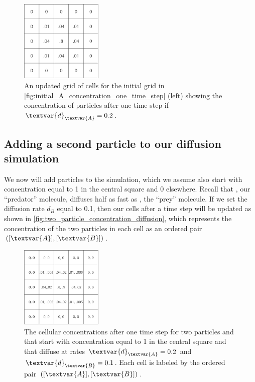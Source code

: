 \begin{figure}[h]
\centering
\mySfFamily
\includegraphics[width = 0.35\textwidth]{../images/A_concentration_slower_diffusion.png}
\caption{An updated grid of cells for the initial grid in \autoref{fig:initial_A_concentration_one_time_step} (left) showing the concentration of  particles after one time step if $\textvar{d}_\textvar{A} = \text{0.2}$.}
\label{fig:A_concentration_slower_diffusion}
\end{figure}

\subsection{Adding a second particle to our diffusion simulation}

We now will add  particles to the simulation, which we assume also start with concentration equal to 1 in the central square and 0 elsewhere. Recall that , our ``predator'' molecule, diffuses half as fast as , the ``prey'' molecule. If we set the diffusion rate $d_B$ equal to 0.1, then our cells after a time step will be updated as shown in \autoref{fig:two_particle_concentration_diffusion}, which represents the concentration of the two particles in each cell as an ordered pair $([\textvar{A}], [\textvar{B}])$.\\

\begin{figure}[h]
\centering
\mySfFamily
\includegraphics[width = 0.35\textwidth]{../images/two_particle_concentration_diffusion.png}
\caption{The cellular concentrations after one time step for two particles  and  that start with concentration equal to 1 in the central square and that diffuse at rates $\textvar{d}_\textvar{A} = \text{0.2}$ and $\textvar{d}_\textvar{B} = \text{0.1}$. Each cell is labeled by the ordered pair $([\textvar{A}], [\textvar{B}])$.}
\label{fig:two_particle_concentration_diffusion}
\end{figure}

